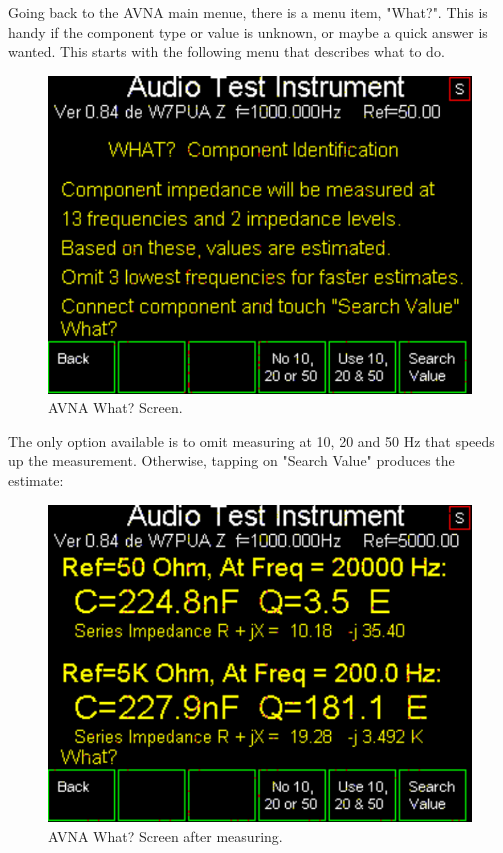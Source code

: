 Going back to the AVNA main menue, there is a menu item, "What?".  This is handy if the component type or value is unknown, or maybe a quick answer is wanted.  This starts with the following menu that describes what to do.
\begin{figure}[H]
\begin{center}
\includegraphics[scale=0.75]{./images/AVNA_012.pdf}
\caption{AVNA What? Screen.}
\label{AVNA_012-label}
\end{center}
\end{figure}
%
The only option available is to omit measuring at 10, 20 and 50 Hz that speeds up the measurement.
Otherwise, tapping on "Search Value" produces the estimate:
\begin{figure}[H]
\begin{center}
\includegraphics[scale=0.75]{./images/AVNA_013.pdf}
\caption{AVNA What? Screen after measuring.}
\label{AVNA_013-label}
\end{center}
\end{figure}
